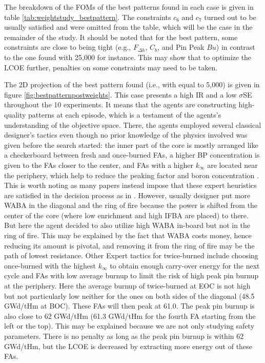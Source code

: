 The breakdown of the FOMs of the best patterns found in each case is given in table \ref{tab:weightstudy_bestpattern}. The constraints $c_6$ and $c_7$ turned out to be usually satisfied and were omitted from the table, which will be the case in the remainder of the study. It should be noted that for the best pattern, some constraints are close to being tight (e.g., $F_{\Delta h}$, $C_b$, and Pin Peak $Bu$) in contrast to the one found with  25,000 for instance. This may show that to optimize the LCOE further, penalties on some constraints may need to be taken.

The 2D projection of the best pattern found (i.e., with  equal to 5,000) is given in figure \ref{fig:bestpatternpostweights}. This case presents a high IR and a low $\sigma$SE throughout the 10 experiments. It means that the agents are constructing high-quality patterns at each episode, which is a testament of the agents's understanding of the objective space. There, the agents employed several classical designer's tactics even though no prior knowledge of the physics involved was given before the search started: the inner part of the core is mostly arranged like a checkerboard between fresh and once-burned FAs, a higher BP concentration is given to the FAs closer to the center, and FAs with a higher $k_{\infty}$ are located near the periphery, which help to reduce the peaking factor and boron concentration \cite{lin2014themaxmin}. This is worth noting as many papers instead impose that these expert heuristics are satisfied in the decision process as in \cite{wu2016quantum,lin2014themaxmin,garco2008new}. However, usually designer put more WABA in the diagonal and the ring of fire because the power is shifted from the center of the core (where low enrichment and high IFBA are placed) to there. But here the agent decided to also utilize high WABA in-board but not in the ring of fire. This may be explained by the fact that WABA costs money, hence reducing its amount is pivotal, and removing it from the ring of fire may be the path of lowest resistance. Other Expert tactics for twice-burned include choosing once-burned with the highest $k_{\infty}$ to obtain enough carry-over energy for the next cycle and FAs with low average burnup to limit the risk of high peak pin burnup at the periphery. Here the average burnup of twice-burned at EOC is not high but not particularly low neither for the ones on both sides of the diagonal (48.5 GWd/tHm at BOC). These FAs will then peak at 61.0. The peak pin burnup is also close to 62 GWd/tHm (61.3 GWd/tHm for the fourth FA starting from the left or the top). This may be explained because we are not only studying safety parameters. There is no penalty as long as the peak pin burnup is within 62 GWd/tHm, but the LCOE is decreased by extracting more energy out of these FAs.
